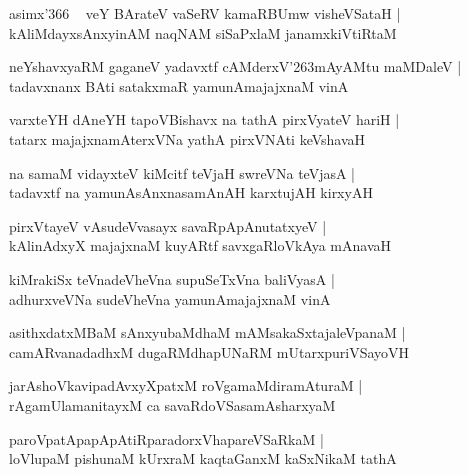 \documentclass[twoside,12pt,openright]{book}
\def\S{\char'263}
\newcounter{shloka}[chapter]
\begin{document}
\begin{shloka}
asimx\char'366 ~ veY BArateV vaSeRV kamaRBUmw visheVSataH |\\
kAliMdayxsAnxyinAM naqNAM siSaPxlaM janamxkiVtiRtaM 
\end{shloka}

\begin{shloka}
neYshavxyaRM gaganeV yadavxtf cAMderxV\S mAyAMtu maMDaleV |\\
tadavxnanx BAti satakxmaR yamunAmajajxnaM vinA 
\end{shloka}

\begin{shloka}
varxteYH dAneYH tapoVBishavx na tathA pirxVyateV hariH |\\
tatarx majajxnamAterxVNa yathA pirxVNAti keVshavaH 
\end{shloka}

\begin{shloka}
na samaM vidayxteV kiMcitf teVjaH swreVNa teVjasA |\\
tadavxtf na yamunAsAnxnasamAnAH karxtujAH kirxyAH 
\end{shloka}

\begin{shloka}
pirxVtayeV vAsudeVvasayx savaRpApAnutatxyeV |\\
kAlinAdxyX majajxnaM kuyARtf savxgaRloVkAya mAnavaH 
\end{shloka}

\begin{shloka}
kiMrakiSx teVnadeVheVna supuSeTxVna baliVyasA |\\
adhurxveVNa sudeVheVna yamunAmajajxnaM vinA 
\end{shloka}

\begin{shloka}
asithxdatxMBaM sAnxyubaMdhaM mAMsakaSxtajaleVpanaM |\\
camARvanadadhxM dugaRMdhapUNaRM mUtarxpuriVSayoVH 
\end{shloka}

\begin{shloka}
jarAshoVkavipadAvxyXpatxM roVgamaMdiramAturaM |\\
rAgamUlamanitayxM ca savaRdoVSasamAsharxyaM 
\end{shloka}

\begin{shloka}
paroVpatApapApAtiRparadorxVhapareVSaRkaM |\\
loVlupaM pishunaM kUrxraM kaqtaGanxM kaSxNikaM tathA
\end{shloka}
\end{document}
